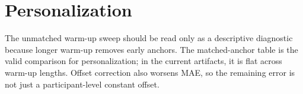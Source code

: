 \section{Personalization}
\label{sec:pers}

\GeneratedPersonalizationInterpretation

\GeneratedPersonalizationTables

\GeneratedPersonalizationFigures

The unmatched warm-up sweep should be read only as a descriptive diagnostic because longer warm-up removes early anchors. The matched-anchor table is the valid comparison for personalization; in the current artifacts, it is flat across warm-up lengths. Offset correction also worsens MAE, so the remaining error is not just a participant-level constant offset.
